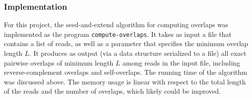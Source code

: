 \documentclass[10pt]{article}
\newcommand{\ProgramName}[1]{{\tt #1}}
\begin{document}
\subsubsection{Implementation}

For this project, the seed-and-extend algorithm for computing overlaps was
implemented as the program \ProgramName{compute-overlaps}.  It takes as input a
file that contains a list of reads, as well as a parameter that specifies the
minimum overlap length $L$.  It produces as output (via a data structure
serialized to a file) all exact pairwise overlaps of minimum length $L$ among
reads in the input file, including reverse-complement overlaps and
self-overlaps.  The running time of the algorithm was discussed above.  The
memory usage is linear with respect to the total length of the reads and the
number of overlaps, which likely could be improved.
\end{document}
